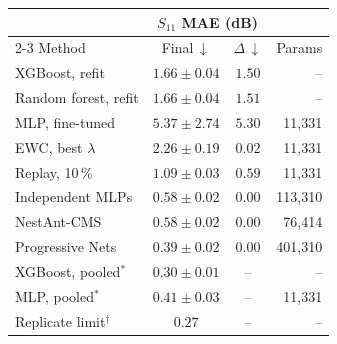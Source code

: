 \begin{tabular}{@{}lccr@{}}
\toprule
 & \multicolumn{2}{c}{$S_{11}$ MAE (dB)} & \\
\cmidrule(lr){2-3}
Method & Final\,$\downarrow$ & $\Delta$\,$\downarrow$ & Params \\
\midrule
XGBoost, refit & $1.66\pm0.04$ & $1.50$ & -- \\
Random forest, refit & $1.66\pm0.04$ & $1.51$ & -- \\
MLP, fine-tuned & $5.37\pm2.74$ & $5.30$ & 11{,}331 \\
EWC, best $\lambda$ & $2.26\pm0.19$ & $0.02$ & 11{,}331 \\
Replay, 10\,\% & $1.09\pm0.03$ & $0.59$ & 11{,}331 \\
Independent MLPs & $0.58\pm0.02$ & $0.00$ & 113{,}310 \\
NestAnt-CMS & $0.58\pm0.02$ & $0.00$ & 76{,}414 \\
Progressive Nets & $0.39\pm0.02$ & $0.00$ & 401{,}310 \\
\midrule
XGBoost, pooled$^\ast$ & $0.30\pm0.01$ & -- & -- \\
MLP, pooled$^\ast$ & $0.41\pm0.03$ & -- & 11{,}331 \\
Replicate limit$^\dagger$ & $0.27$ & -- & -- \\
\bottomrule
\end{tabular}
